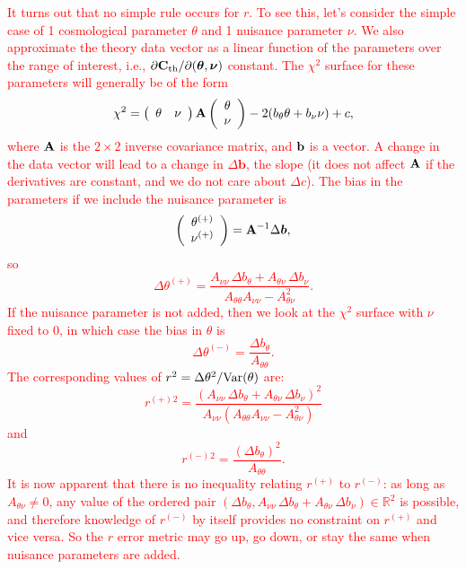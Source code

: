 \documentclass[usenatbib]{mnras}
\newcommand{\changetext}[1]{\textcolor{red}{#1}}
\begin{document}
\changetext{It turns out that no simple rule occurs for $r$. To see this, let's consider the simple case of 1 cosmological parameter $\theta$ and 1 nuisance parameter $\nu$. We also approximate the theory data vector as a linear function of the parameters over the range of interest, i.e., $\partial{\bf C}_{\rm th}/\partial({\boldsymbol\theta},{\boldsymbol\nu})$ constant. The $\chi^2$ surface for these parameters will generally be of the form
\begin{equation}
\chi^2 = \left( \begin{array}{cc} \theta & \nu \end{array} \right) {\bf A}  \left( \begin{array}c \theta \\ \nu \end{array} \right)
- 2 (b_\theta \theta + b_\nu\nu) + c,
\end{equation}
where ${\bf A}$ is the $2\times 2$ inverse covariance matrix, and ${\bf b}$ is a vector. A change in the data vector will lead to a change in $\Delta{\boldsymbol b}$, the slope (it does not affect ${\bf A}$ if the derivatives are constant, and we do not care about $\Delta c$). The bias in the parameters if we include the nuisance parameter is
\begin{equation}
\left( \begin{array}c \theta^{(+)} \\ \nu^{(+)} \end{array} \right) = {\bf A}^{-1}\Delta{\boldsymbol b},
\end{equation}
so
\begin{equation}
\Delta\theta^{(+)} = \frac{A_{\nu\nu}\,\Delta b_\theta + A_{\theta\nu}\,\Delta b_\nu}{A_{\theta\theta} A_{\nu\nu} - A_{\theta\nu}^2}.
\end{equation}
If the nuisance parameter is not added, then we look at the $\chi^2$ surface with $\nu$ fixed to 0, in which case the bias in $\theta$ is
\begin{equation}
\Delta\theta^{(-)} = \frac{\Delta b_\theta}{A_{\theta\theta}}.
\end{equation}
The corresponding values of $r^2 = \Delta\theta^2 / {\rm Var}(\theta)$ are:
\begin{equation}
r^{(+)}{^2} = \frac{(A_{\nu\nu}\,\Delta b_\theta + A_{\theta\nu}\,\Delta b_\nu)^2}{A_{\nu\nu}(A_{\theta\theta} A_{\nu\nu} - A_{\theta\nu}^2)}
\end{equation}
and
\begin{equation}
r^{(-)}{^2} = \frac{(\Delta b_\theta)^2}{A_{\theta\theta}}.
\end{equation}
It is now apparent that there is no inequality relating $r^{(+)}$ to $r^{(-)}$: as long as $A_{\theta\nu}\neq 0$, any value of the ordered pair $(\Delta b_\theta, A_{\nu\nu}\,\Delta b_\theta + A_{\theta\nu}\,\Delta b_\nu)\in{\mathbb R}^2$ is possible, and therefore knowledge of $r^{(-)}$ by itself provides no constraint on $r^{(+)}$ and vice versa. So the $r$ error metric may go up, go down, or stay the same when nuisance parameters are added.
}
\end{document}
